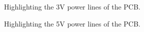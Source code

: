 \documentclass[12pt]{article}
\numberwithin{subsubsubsection}{subsubsection}
\begin{document}
\begin{figure}[H]
    \centering
    \caption{Highlighting the 3V power lines of the PCB.}
    \label{fig:3V}
\end{figure}


\begin{figure}[H]
    \centering
    \caption{Highlighting the 5V power lines of the PCB.}
    \label{fig:5V}
\end{figure}
\end{document}
